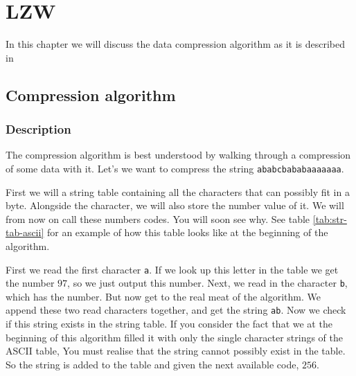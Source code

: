 \begin{comment}
  
\end{comment}

\chapter{LZW}
\label{ch:rle}

\begin{refsection}

In this chapter we will discuss the data compression algorithm \lzw as
it is described in
\cite{nelson89:_lzw_data_compr,Welch:1984:THD:1319729.1320134,Salomon:2004:DCC}

\section{Compression algorithm}

\subsection{Description}

The \lzw compression algorithm is best understood by walking through a
compression of some data with it. Let's we want to compress the
string \texttt{ababcbababaaaaaaa}.

First we will a string table containing all the characters that can
possibly fit in a byte. Alongside the character, we will also store
the \ascii number value of it. We will from now on call these numbers
codes. You will soon see why. See table \ref{tab:str-tab-ascii} for an
example of how this table looks like at the beginning of the algorithm.

First we read the first character \texttt{a}. If we look up this
letter in the table we get the number $97$, so we just output this
number. Next, we read in the character \texttt{b}, which has the
number. But now get to the real meat of the algorithm. We append
these two read characters together, and get  the string
\texttt{ab}. Now we check if this string exists in the string
table. If you consider the fact that we at the beginning of this
algorithm filled it with only the single character strings of the
ASCII table, You must realise that the string cannot possibly exist
in the table. So the string is added to the table and given the next
available code, $256$.


\end{refsection}
